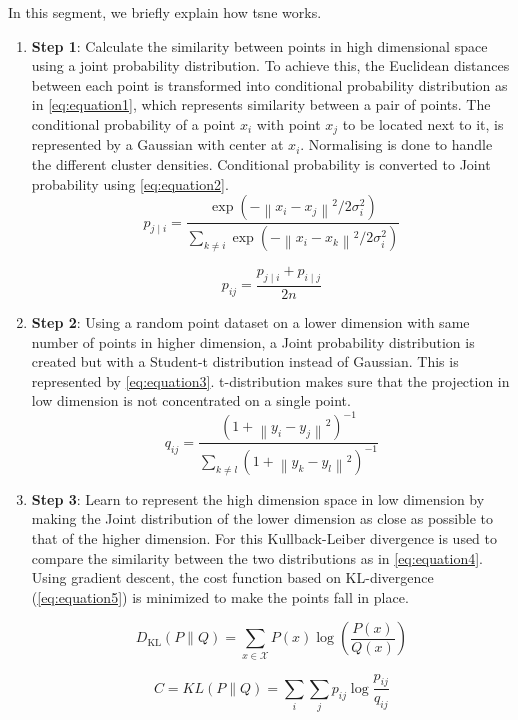 In this segment, we briefly explain how \gls{tsne} works.

\begin{enumerate}
    \item \textbf{Step 1}: Calculate the similarity between points in high dimensional space using a joint probability distribution.
        To achieve this, the Euclidean distances between each point is transformed into conditional probability distribution as in \autoref{eq:equation1}, which represents similarity between a pair of points.
        The conditional probability of a point $x_i$ with point $x_j$ to be located next to it, is represented by a Gaussian with center at $x_i$.
        Normalising is done to handle the different cluster densities.
        Conditional probability is converted to Joint probability using \autoref{eq:equation2}.
    \begin{equation}
        p_{j \mid i}=\frac{\exp \left(-\left\|x_{i}-x_{j}\right\|^{2} / 2 \sigma_{i}^{2}\right)}{\sum_{k \neq i} \exp \left(-\left\|x_{i}-x_{k}\right\|^{2} / 2 \sigma_{i}^{2}\right)}
        \label{eq:equation1}
    \end{equation}

    \begin{equation}
        p_{i j}=\frac{p_{j \mid i}+p_{i \mid j}}{2 n}
        \label{eq:equation2}
    \end{equation}

    \item \textbf{Step 2}: Using a random point dataset on a lower dimension with same number of points in higher dimension, a Joint probability distribution is created but with a Student-t distribution instead of Gaussian.
    This is represented by \autoref{eq:equation3}.
    t-distribution makes sure that the projection in low dimension is not concentrated on a single point.
    \begin{equation}
        q_{ij} = \frac{(1+\left \| y_{i}-y_{j} \right \|^{2})^{-1}}{\sum _{k\neq l} (1+\left \| y_{k}-y_{l} \right \|^{2})^{-1}}
        \label{eq:equation3}
    \end{equation}

    \item \textbf{Step 3}: Learn to represent the high dimension space in low dimension by making the Joint distribution of the lower dimension as close as possible to that of the higher dimension.
    For this Kullback-Leiber divergence\cite{Joyce2011} is used to compare the similarity between the two distributions as in \autoref{eq:equation4}.
    Using gradient descent, the cost function based on KL-divergence (\autoref{eq:equation5}) is minimized to make the points fall in place.

    \begin{equation}
        D_{\mathrm{KL}}(P \| Q)=\sum_{x \in \mathcal{X}} P(x) \log \left(\frac{P(x)}{Q(x)}\right)
        \label{eq:equation4}
    \end{equation}

    \begin{equation}
        C=K L(P \| Q)=\sum_{i} \sum_{j} p_{i j} \log \frac{p_{i j}}{q_{i j}}
        \label{eq:equation5}
    \end{equation}
\end{enumerate}

